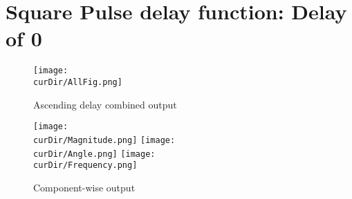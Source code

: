 \newpage
\newcommand{\curDir}{PMUsim-figures/Square/DelayOf_0}
\section{Square Pulse delay function: Delay of 0}
\begin{figure}[hb]
    \texttt{[image: \\curDir/AllFig.png]}    
    \caption{Ascending delay combined output}
    \label{fig:PMUsim-Sqa0-allfig}
\end{figure}


     \begin{figure}
        \caption{Component-wise output}
 
    \texttt{[image: \\curDir/Magnitude.png]}    
         \label{fig:PMUsim-Sqa0Mag}
   \texttt{[image: \\curDir/Angle.png]}    
         \label{fig:PMUsim-Sqa0Ang}
   \texttt{[image: \\curDir/Frequency.png]}    
         \label{fig:PMUsim-Sqa0Freq}
 
\end{figure}


